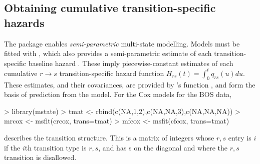 \documentclass[nojss,nofooter]{jss}
\begin{document}
\subsection{Obtaining cumulative transition-specific hazards}

The  package enables \emph{semi-parametric} multi-state
modelling.  Models must be fitted with , which also
provides a semi-parametric estimate of each transition-specific
baseline hazard \citep{mstate:cmpb,mstate:jss}.  These imply
piecewise-constant estimates of each cumulative $r \rightarrow s$
transition-specific hazard function $H_{rs}(t) = \int_0^t q_{rs}(u)
du$.  These estimates, and their covariances, are provided by
's function , and form the basis of prediction
from the model.  For the Cox models for the BOS data,
\begin{Schunk}
\begin{Sinput}
> library(mstate)
> tmat <- rbind(c(NA,1,2),c(NA,NA,3),c(NA,NA,NA))
> mrcox <- msfit(crcox, trans=tmat)
> mfcox <- msfit(cfcox, trans=tmat)
\end{Sinput}
\end{Schunk}
 describes the transition structure.  This is a matrix of
integers whose $r,s$ entry is $i$ if the $i$th transition type is
$r,s$, and has s on the diagonal and where the $r,s$
transition is disallowed.
\end{document}
